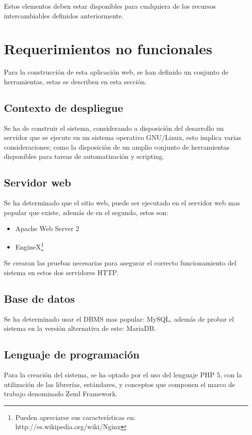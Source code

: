 Estos elementos deben estar disponibles para cualquiera de los recursos
intercambiables definidos anteriormente.

\section{Requerimientos no funcionales}

Para la construcción de esta aplicación web, se han definido un conjunto de
herramientas, estas se describen en esta sección.

\subsection{Contexto de despliegue}
Se ha de construir el sistema, considerando a disposición del desarrollo un
servidor que se ejecute en un sistema operativo GNU/Linux, esto implica varias
consideraciones; como la disposición de un amplio conjunto de
herramientas disponibles para tareas de automatización y scripting.

\subsection{Servidor web}
Se ha determinado que el sitio web, puede ser ejecutado en el servidor web mas
popular que existe, además de en el segundo, estos son:

\begin{itemize}
\item Apache Web Server 2
\item EngineX\footnote{Pueden apreciarse sus características en:
http://es.wikipedia.org/wiki/Nginx}
\end{itemize}

Se crearan las pruebas necesarias para asegurar el correcto funcionamiento del
sistema en estos dos servidores HTTP.

\subsection{Base de datos}

Se ha determinado usar el DBMS mas popular: MySQL, además de probar el sistema
en la versión alternativa de este: MariaDB.

\subsection{Lenguaje de programación}

Para la creación del sistema, se ha optado por el uso del lenguaje PHP 5, con la
utilización de las librerías, estándares, y conceptos  que componen el marco
de trabajo denominado Zend Framework.

